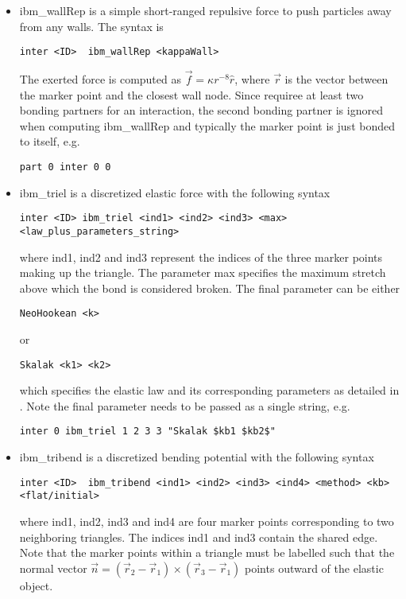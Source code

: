\begin{itemize}
\item ibm\_wallRep is a simple short-ranged repulsive force to push particles away from any walls. The syntax is
\begin{verbatim}
inter <ID>  ibm_wallRep <kappaWall>
\end{verbatim}
The exerted force is computed as $\vec{f} = \kappa r^{-8} \hat{r}$, where $\vec{r}$ is the vector between the marker point and the closest wall node. Since \es requiree at least two bonding partners for an interaction, the second bonding partner is ignored when computing ibm\_wallRep and typically the marker point is just bonded to itself, e.g.
\begin{verbatim}
part 0 inter 0 0
\end{verbatim}

\item ibm\_triel is a discretized elastic force with the following syntax
\begin{verbatim}
inter <ID> ibm_triel <ind1> <ind2> <ind3> <max>  <law_plus_parameters_string>
\end{verbatim}
where ind1, ind2 and ind3 represent the indices of the three marker points making up the triangle. The parameter max specifies the maximum stretch above which the bond is considered broken. The final parameter can be either
\begin{verbatim}
NeoHookean <k>
\end{verbatim}
or
\begin{verbatim}
Skalak <k1> <k2>
\end{verbatim}
which specifies the elastic law and its corresponding parameters as detailed in . Note the final parameter needs to be passed as a single string, e.g.
\begin{verbatim}
inter 0 ibm_triel 1 2 3 3 "Skalak $kb1 $kb2$"
\end{verbatim}

\item ibm\_tribend is a discretized bending potential with the following syntax
\begin{verbatim}
inter <ID>  ibm_tribend <ind1> <ind2> <ind3> <ind4> <method> <kb> <flat/initial>
\end{verbatim}
where ind1, ind2, ind3 and ind4 are four marker points corresponding to two neighboring triangles. The indices ind1 and ind3 contain the shared edge. Note that the marker points within a triangle must be labelled such that the normal vector $\vec{n} = (\vec{r}_2 - \vec{r}_1) \times (\vec{r}_3 - \vec{r}_1)$ points outward of the elastic object. 


\end{itemize}
